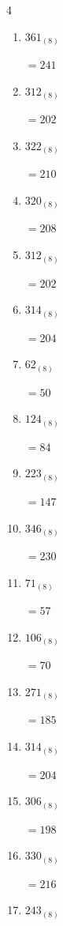 \begin{multicols}{4}
\begin{enumerate}
  \item $361_{(8)}$

        $=241$

  \item $312_{(8)}$

        $=202$

  \item $322_{(8)}$

        $=210$

  \item $320_{(8)}$

        $=208$

  \item $312_{(8)}$

        $=202$

  \item $314_{(8)}$

        $=204$

\columnbreak %

  \item $62_{(8)}$

        $=50$

  \item $124_{(8)}$

        $=84$

  \item $223_{(8)}$

        $=147$

  \item $346_{(8)}$

        $=230$

  \item $71_{(8)}$

        $=57$

  \item $106_{(8)}$

        $=70$

  \item $271_{(8)}$

        $=185$

  \item $314_{(8)}$

        $=204$

  \item $306_{(8)}$

        $=198$

  \item $330_{(8)}$

        $=216$

  \item $243_{(8)}$


\end{enumerate}
\end{multicols}
